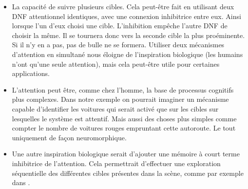 	\begin{itemize}
		\item La capacité de suivre plusieurs cibles. Cela peut-être fait en utilisant deux DNF attentionnel identiques, avec une connexion inhibitrice entre eux. Ainsi lorsque l'un d'eux choisi une cible. L'inhibition empêche l'autre DNF de choisir la même. Il se tournera donc vers la seconde cible la plus proéminente. Si il n'y en a pas, pas de bulle ne se formera. Utiliser deux mécanismes d'attention en simultané nous éloigne de l'inspiration biologique (les humains n'ont qu'une seule attention), mais cela peut-être utile pour certaines applications.
		\item L'attention peut être, comme chez l'homme, la base de processus cognitifs plus complexes. Dans notre exemple on pourrait imaginer un mécanisme capable d'identifier les voitures qui serait activé que sur les cibles sur lesquelles le système est attentif. Mais aussi des choses plus simples comme compter le nombre de voitures rouges empruntant cette autoroute. Le tout uniquement de façon neuromorphique.
		\item Une autre inspiration biologique serait d'ajouter une mémoire à court terme inhibitrice de l'attention. Cela permettrait d'effectuer une exploration séquentielle des différentes cibles présentes dans la scène, comme par exemple dans \cite{fix2011dynamic}.
	\end{itemize}
		

